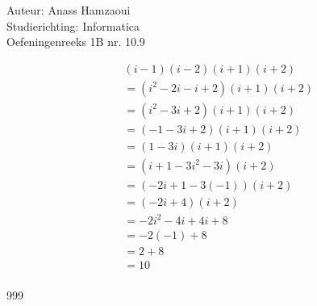 \documentclass[a4paper]{article}
\begin{document}
  
\noindent \large Auteur: Anass Hamzaoui \\
\noindent \large Studierichting: Informatica \\
\noindent \large Oefeningenreeks 1B nr. 10.9 \\

\medskip

\normalsize

\begin{eqnarray*}
    && (i - 1)(i - 2)(i + 1)(i + 2) \\
    && = (i^2 - 2i - i + 2)(i + 1)(i + 2) \\
    && = (i^2 - 3i + 2)(i + 1)(i + 2) \\
    && = (-1 - 3i + 2)(i + 1)(i + 2) \\
    && = (1 - 3i)(i + 1)(i + 2) \\
    && = (i + 1 - 3i^2 - 3i)(i + 2) \\
    && = (-2i + 1 - 3(-1))(i + 2) \\
    && = (-2i + 4)(i + 2) \\
    && = -2i^2 - 4i + 4i + 8 \\
    && = -2(-1) + 8 \\
    && = 2 + 8 \\
    && = 10 \\
\end{eqnarray*}

\begin{thebibliography}{999}
\end{thebibliography}
\end{document}
